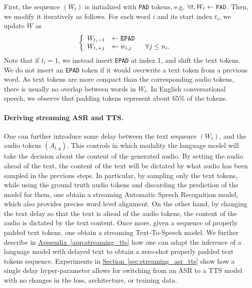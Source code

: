 First, the sequence $(W_t)$ is initialized with \texttt{PAD} tokens, e.g. $\forall t, W_t \leftarrow \text{\texttt{PAD}}$. Then, we modify it iteratively as follows. For each word $i$ and its start index $t_i$, we update $W$ as
\begin{equation}
\left\{\begin{array}{ll}
    W_{t_i - 1} &\leftarrow \text{\texttt{EPAD}} \\
    W_{t_i + j} &\leftarrow w_{i, j} \qquad \forall j \leq n_i.
\end{array}\right.
\end{equation}
Note that if $t_i = 1$, we instead insert \texttt{EPAD} at index 1, and shift the text tokens. We do not insert an \texttt{EPAD} token if it would overwrite a text token from a previous word. As text tokens are more compact than the corresponding audio tokens, there is 
usually no overlap between words in $W_t$. In English conversational speech, we observe that padding tokens represent about 65\% of the tokens.

\paragraph{Deriving streaming ASR and TTS.}

One can further introduce some delay between the text sequence $(W_t)$, and the audio tokens $(A_{t, q})$. This controls in which modality the language model will take the decision about the content of the generated audio. By setting the audio ahead of the text, 
the content of the text will be dictated by what audio has been sampled in the previous steps. In particular, by sampling only the text tokens, while using the ground truth audio tokens and discarding the prediction of the model for them, one obtain a streaming Automatic Speech Recognition model, which also provides precise word level alignment. On the other hand, by changing the text delay so that the text is ahead of the audio tokens, the content of the audio is dictated by the text content. Once more, given a sequence of properly padded text tokens, one obtain a streaming Text-To-Speech model. We further describe in \hyperref[app:streaming_tts]{Appendix~\ref{app:streaming_tts}} how one can adapt the inference of a language model with delayed text to obtain a zero-shot properly padded text tokens sequence. 
Experiments in \hyperref[sec:streaming_asr_tts]{Section~\ref{sec:streaming_asr_tts}} show how a single delay hyper-parameter allows for switching from an ASR to a TTS model with no changes in the loss, architecture, or training data.

